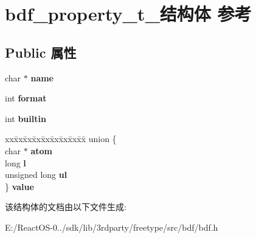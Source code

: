 \hypertarget{structbdf__property__t__}{}\section{bdf\+\_\+property\+\_\+t\+\_\+结构体 参考}
\label{structbdf__property__t__}
\subsection*{Public 属性}
\begin{DoxyCompactItemize}
\item 
\mbox{\label{structbdf__property__t___a61ccd4a2803d934a69a86c5e00a71037}} 
char $\ast$ {\bfseries name}
\item 
\mbox{\label{structbdf__property__t___a44b9e9cd4cebf80e8c5b8d538c0b9b56}} 
int {\bfseries format}
\item 
\mbox{\label{structbdf__property__t___aa54a02c4da06f9bc10f6ded941a8e32f}} 
int {\bfseries builtin}
\item 
\mbox{\label{structbdf__property__t___a6aa406595a68671ce6186da5628ac828}} 
\begin{tabbing}
xx\=xx\=xx\=xx\=xx\=xx\=xx\=xx\=xx\=\kill
union \{\\
\>char $\ast$ {\bfseries atom}\\
\>long {\bfseries l}\\
\>unsigned long {\bfseries ul}\\
\} {\bfseries value}\\

\end{tabbing}\end{DoxyCompactItemize}


该结构体的文档由以下文件生成\+:\begin{DoxyCompactItemize}
\item 
E\+:/\+React\+O\+S-\/0../sdk/lib/3rdparty/freetype/src/bdf/bdf.\+h\end{DoxyCompactItemize}
